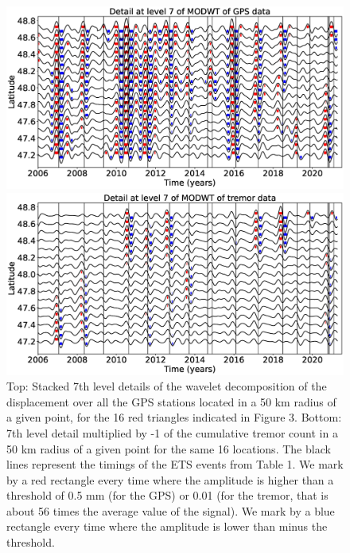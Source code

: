 \documentclass{article}
\begin{document}
\begin{figure}
\noindent\includegraphics[width=\textwidth, trim={0cm 0cm 0cm 0cm},clip]{figures/GPS_longer_detail_7.eps}

\noindent\includegraphics[width=\textwidth, trim={0cm 0cm 0cm 0cm},clip]{figures/tremor_longer_detail_7.eps}
\caption{Top: Stacked 7th level details of the wavelet decomposition of the displacement over all the GPS stations located in a 50 km radius of a given point, for the 16 red triangles indicated in Figure 3. Bottom: 7th level detail multiplied by -1 of the cumulative tremor count in a 50 km radius of a given point for the same 16 locations. The black lines represent the timings of the ETS events from Table 1. We mark by a red rectangle every time where the amplitude is higher than a threshold of 0.5 mm (for the GPS) or 0.01 (for the tremor, that is about 56 times the average value of the signal). We mark by a blue rectangle every time where the amplitude is lower than minus the threshold.}
\label{pngfiguresample}
\end{figure}
\end{document}
